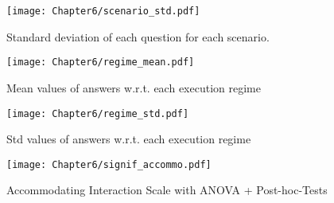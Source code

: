 \begin{figure}[h]
    \texttt{[image: Chapter6/scenario\_std.pdf]}
    \caption{Standard deviation of each question for each scenario.}
    \label{fig:scenario_std}
\end{figure}

\begin{figure}[h]
    \texttt{[image: Chapter6/regime\_mean.pdf]}
    \caption{Mean values of answers w.r.t. each execution regime}
    \label{fig:regime_mean}
\end{figure}

\begin{figure}[h]
    \texttt{[image: Chapter6/regime\_std.pdf]}
    \caption{Std values of answers w.r.t. each execution regime}
    \label{fig:regime_std}
\end{figure}

\begin{figure}[h]
    \centering
    \texttt{[image: Chapter6/signif\_accommo.pdf]}
    \caption{Accommodating Interaction Scale with ANOVA + Post-hoc-Tests}
    \label{fig:accommodating_scale_anova}
\end{figure}


